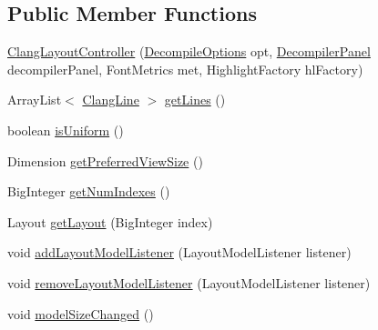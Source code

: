 \subsection*{Public Member Functions}
\begin{DoxyCompactItemize}
\item 
\mbox{\hyperlink{classghidra_1_1app_1_1decompiler_1_1component_1_1_clang_layout_controller_a80919e1f9ac07f62481a8664da049bc1}{Clang\+Layout\+Controller}} (\mbox{\hyperlink{classghidra_1_1app_1_1decompiler_1_1_decompile_options}{Decompile\+Options}} opt, \mbox{\hyperlink{classghidra_1_1app_1_1decompiler_1_1component_1_1_decompiler_panel}{Decompiler\+Panel}} decompiler\+Panel, Font\+Metrics met, Highlight\+Factory hl\+Factory)
\item 
Array\+List$<$ \mbox{\hyperlink{classghidra_1_1app_1_1decompiler_1_1_clang_line}{Clang\+Line}} $>$ \mbox{\hyperlink{classghidra_1_1app_1_1decompiler_1_1component_1_1_clang_layout_controller_afe26d06573964fae5ecfc801d315e092}{get\+Lines}} ()
\item 
boolean \mbox{\hyperlink{classghidra_1_1app_1_1decompiler_1_1component_1_1_clang_layout_controller_a6f361f56f9f57d80d74d19f73964e2bc}{is\+Uniform}} ()
\item 
Dimension \mbox{\hyperlink{classghidra_1_1app_1_1decompiler_1_1component_1_1_clang_layout_controller_a3be35395cbc7239f7cec8616d699e34b}{get\+Preferred\+View\+Size}} ()
\item 
Big\+Integer \mbox{\hyperlink{classghidra_1_1app_1_1decompiler_1_1component_1_1_clang_layout_controller_a724aeb98b817a67d888b20d07328fde7}{get\+Num\+Indexes}} ()
\item 
Layout \mbox{\hyperlink{classghidra_1_1app_1_1decompiler_1_1component_1_1_clang_layout_controller_a13138a32ea7fac221566ccf3f4c30ae2}{get\+Layout}} (Big\+Integer index)
\item 
void \mbox{\hyperlink{classghidra_1_1app_1_1decompiler_1_1component_1_1_clang_layout_controller_ae96b3448e1626690aeca5d92826a832a}{add\+Layout\+Model\+Listener}} (Layout\+Model\+Listener listener)
\item 
void \mbox{\hyperlink{classghidra_1_1app_1_1decompiler_1_1component_1_1_clang_layout_controller_af8e271ca1dc564905f383fcb618e63c2}{remove\+Layout\+Model\+Listener}} (Layout\+Model\+Listener listener)
\item 
void \mbox{\hyperlink{classghidra_1_1app_1_1decompiler_1_1component_1_1_clang_layout_controller_afbb355aefe495753c736e42d16f2fced}{model\+Size\+Changed}} ()
\item 

\end{DoxyCompactItemize}
